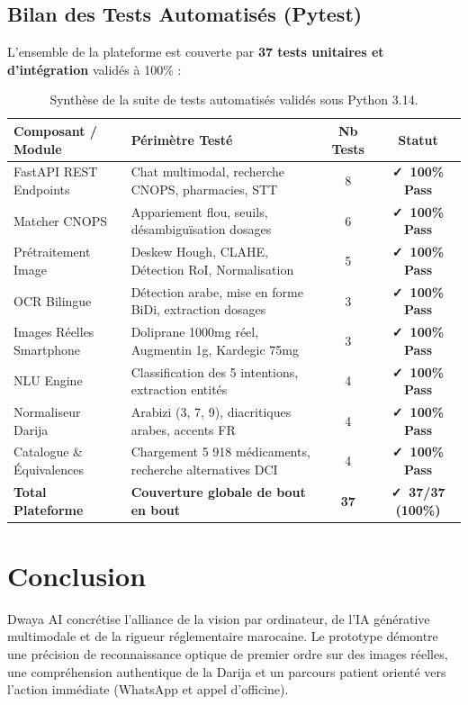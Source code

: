 \documentclass[a4paper,10pt]{article}
\begin{document}
\subsection{Bilan des Tests Automatisés (Pytest)}
L'ensemble de la plateforme est couverte par \textbf{37 tests unitaires et d'intégration} validés à 100\% :

\begin{table}[h!]
\centering \footnotesize
\begin{tabular}{llcc}
\toprule
\textbf{Composant / Module} & \textbf{Périmètre Testé} & \textbf{Nb Tests} & \textbf{Statut} \\
\midrule
FastAPI REST Endpoints & Chat multimodal, recherche CNOPS, pharmacies, STT & 8 & \textbf{\faCheck~100\% Pass} \\
Matcher CNOPS & Appariement flou, seuils, désambiguïsation dosages & 6 & \textbf{\faCheck~100\% Pass} \\
Prétraitement Image & Deskew Hough, CLAHE, Détection RoI, Normalisation & 5 & \textbf{\faCheck~100\% Pass} \\
OCR Bilingue & Détection arabe, mise en forme BiDi, extraction dosages & 3 & \textbf{\faCheck~100\% Pass} \\
Images Réelles Smartphone & Doliprane 1000mg réel, Augmentin 1g, Kardegic 75mg & 3 & \textbf{\faCheck~100\% Pass} \\
NLU Engine & Classification des 5 intentions, extraction entités & 4 & \textbf{\faCheck~100\% Pass} \\
Normaliseur Darija & Arabizi (3, 7, 9), diacritiques arabes, accents FR & 4 & \textbf{\faCheck~100\% Pass} \\
Catalogue \& Équivalences & Chargement 5 918 médicaments, recherche alternatives DCI & 4 & \textbf{\faCheck~100\% Pass} \\
\midrule
\textbf{Total Plateforme} & \textbf{Couverture globale de bout en bout} & \textbf{37} & \textbf{\faCheck~37/37 (100\%)} \\
\bottomrule
\end{tabular}
\caption{Synthèse de la suite de tests automatisés validés sous Python 3.14.}
\end{table}

\section{Conclusion}

Dwaya AI concrétise l'alliance de la vision par ordinateur, de l'IA générative multimodale et de la rigueur réglementaire marocaine. Le prototype démontre une précision de reconnaissance optique de premier ordre sur des images réelles, une compréhension authentique de la Darija et un parcours patient orienté vers l'action immédiate (WhatsApp et appel d'officine).
\end{document}
